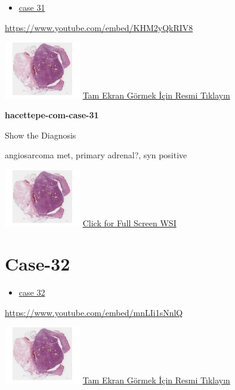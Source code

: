 \documentclass[
  letterpaper,
  paper=6in:9in,
  pagesize=pdftex,
  headinclude=on,
  footinclude=on,
  12pt]{scrbook}
\providecommand{\tightlist}{%
  \setlength{\itemsep}{0pt}\setlength{\parskip}{0pt}}\usepackage{longtable,booktabs,array}
\begin{document}
\begin{itemize}
\tightlist
\item
  \href{https://www.youtube.com/watch?v=KHM2yQkRIV8\&ab_channel=KemalKosemehmetoglu}{case
  31}
\end{itemize}

\url{https://www.youtube.com/embed/KHM2yQkRIV8}

\href{https://images.patolojiatlasi.com/hacettepe-com-case-1/HE.html}{\includegraphics[width=0.25\textwidth,height=\textheight]{./screenshots/hacettepe-com-case-1_screenshot.png}}
\href{https://images.patolojiatlasi.com/hacettepe-com-case-31/HE.html}{Tam
Ekran Görmek İçin Resmi Tıklayın}

\textbf{hacettepe-com-case-31}

Show the Diagnosis

\hypertarget{answer31}{}
angiosarcoma met, primary adrenal?, syn positive

\href{https://images.patolojiatlasi.com/hacettepe-com-case-1/HE.html}{\includegraphics[width=0.25\textwidth,height=\textheight]{./screenshots/hacettepe-com-case-1_screenshot.png}}
\href{https://images.patolojiatlasi.com/hacettepe-com-case-31/HE.html}{Click
for Full Screen WSI}

\hypertarget{sec-hacettepe-case-of-the-month-case-32}{%
\section{Case-32}\label{sec-hacettepe-case-of-the-month-case-32}}

\begin{itemize}
\tightlist
\item
  \href{https://www.youtube.com/watch?v=mnLIi1sNnlQ\&ab_channel=KemalKosemehmetoglu}{case
  32}
\end{itemize}

\url{https://www.youtube.com/embed/mnLIi1sNnlQ}

\href{https://images.patolojiatlasi.com/hacettepe-com-case-1/HE.html}{\includegraphics[width=0.25\textwidth,height=\textheight]{./screenshots/hacettepe-com-case-1_screenshot.png}}
\href{https://images.patolojiatlasi.com/hacettepe-com-case-32/HE.html}{Tam
Ekran Görmek İçin Resmi Tıklayın}
\end{document}
